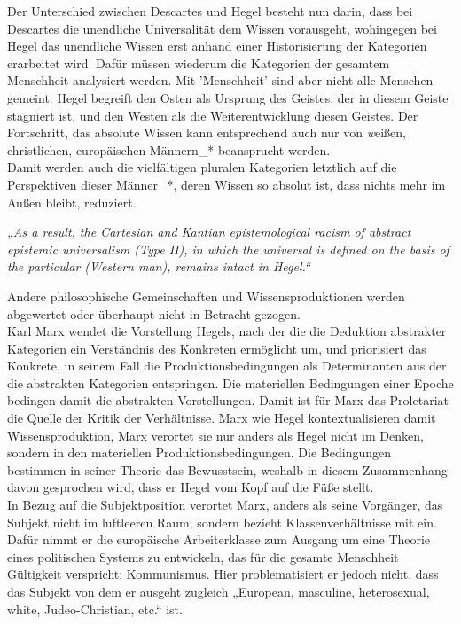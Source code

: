 \noindent Der Unterschied zwischen Descartes und Hegel besteht nun darin, dass bei
Descartes die unendliche Universalität dem Wissen vorausgeht, wohingegen bei
Hegel das unendliche Wissen erst anhand einer Historisierung der Kategorien
erarbeitet wird. Dafür müssen wiederum die Kategorien der gesamtem Menschheit
analysiert werden.  Mit 'Menschheit' sind aber nicht alle Menschen gemeint. Hegel
begreift den Osten als Ursprung des Geistes, der in diesem Geiste stagniert
ist, und den Westen als die Weiterentwicklung diesen Geistes. Der Fortschritt,
das absolute Wissen kann entsprechend auch nur von \textit{w}eißen, christlichen,
europäischen Männern\_* beansprucht werden.\\
Damit werden auch die vielfältigen pluralen Kategorien letztlich auf die
Perspektiven dieser Männer\_*, deren Wissen so absolut ist, dass nichts mehr im
Außen bleibt, reduziert.  
\begin{myenv} 
  \textit{„As a result, the Cartesian and Kantian
  epistemological racism of abstract epistemic universalism (Type II), in which
the universal is defined on the basis of the particular (Western man), remains
intact in Hegel.“\footnotemark {} }
\end{myenv}
Andere philosophische Gemeinschaften und Wissensproduktionen werden abgewertet oder überhaupt nicht in Betracht gezogen.\\

Karl Marx wendet die Vorstellung Hegels, nach der die die Deduktion abstrakter
Kategorien ein Verständnis des Konkreten ermöglicht um, und priorisiert das
Konkrete, in seinem Fall die Produktionsbedingungen als Determinanten aus der
die abstrakten Kategorien entspringen.\footnotemark {} Die materiellen Bedingungen einer
Epoche bedingen damit die abstrakten Vorstellungen. Damit ist für Marx das
Proletariat die Quelle der Kritik der Verhältnisse. Marx wie Hegel
kontextualisieren damit Wissensproduktion, Marx verortet sie nur anders als
Hegel nicht im Denken, sondern in den materiellen Produktionsbedingungen. Die
Bedingungen bestimmen in seiner Theorie das Bewusstsein, weshalb in diesem
Zusammenhang davon gesprochen wird, dass er Hegel vom Kopf auf die Füße stellt.\\
In Bezug auf die Subjektposition verortet Marx, anders als seine Vorgänger, das
Subjekt nicht im luftleeren Raum, sondern bezieht Klassenverhältnisse mit ein.
Dafür nimmt er die europäische Arbeiterklasse zum Ausgang um eine Theorie eines
politischen Systems zu entwickeln, das für die gesamte Menschheit Gültigkeit
verspricht: Kommunismus. Hier problematisiert er jedoch nicht, dass das Subjekt
von dem er ausgeht zugleich  „European, masculine, heterosexual, white,
Judeo-Christian, etc.“\footnotemark {} ist.\\

